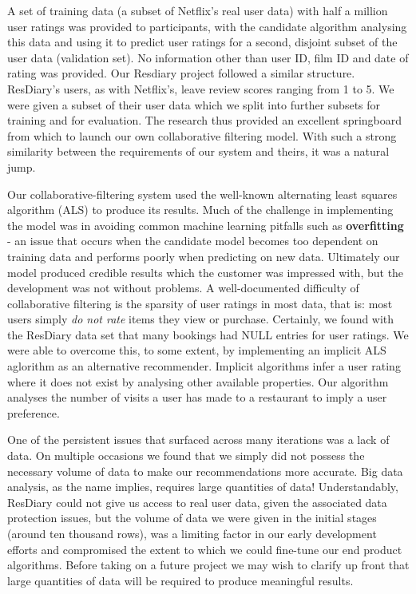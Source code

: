 \documentclass{l3proj}
\begin{document}
A set of training data (a subset of Netflix's real user data) with half a million user ratings was provided to participants, with the candidate algorithm analysing this data and using it to predict user ratings for a second, disjoint subset of the user data (validation set). No information other than user ID, film ID and date of rating was provided. Our Resdiary project followed a similar structure. ResDiary's users, as with Netflix's, leave review scores ranging from 1 to 5. We were given a subset of their user data which we split into further subsets for training and for evaluation. The research thus provided an excellent springboard from which to launch our own collaborative filtering model. With such a strong similarity between the requirements of our system and theirs, it was a natural jump.

Our collaborative-filtering system used the well-known alternating least squares algorithm (ALS) to produce its results. Much of the challenge in implementing the model was in avoiding common machine learning pitfalls such as \textbf{overfitting} - an issue that occurs when the candidate model becomes too dependent on training data and performs poorly when predicting on new data. Ultimately our model produced credible results which the customer was impressed with, but the development was not without problems. A well-documented difficulty of collaborative filtering is the sparsity of user ratings in most data, that is: most users simply \textit{do not rate} items they view or purchase. Certainly, we found with the ResDiary data set that many bookings had NULL entries for user ratings. We were able to overcome this, to some extent, by implementing an implicit ALS aglorithm as an alternative recommender. Implicit algorithms infer a user rating where it does not exist by analysing other available properties. Our algorithm analyses the number of visits a user has made to a restaurant to imply a user preference.

One of the persistent issues that surfaced across many iterations was a lack of data. On multiple occasions we found that we simply did not possess the necessary volume of data to make our recommendations more accurate. Big data analysis, as the name implies, requires large quantities of data! Understandably, ResDiary could not give us access to real user data, given the associated data protection issues, but the volume of data we were given in the initial stages (around ten thousand rows), was a limiting factor in our early development efforts and compromised the extent to which we could fine-tune our end product algorithms. Before taking on a future project we may wish to clarify up front that large quantities of data will be required to produce meaningful results.
\end{document}
